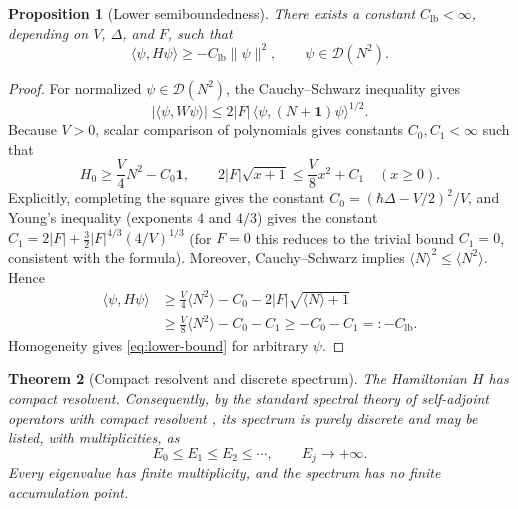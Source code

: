 \documentclass[11pt]{article}
\newtheorem{theorem}{Theorem}[section]
\newtheorem{proposition}[theorem]{Proposition}
\theoremstyle{remark}
\newcommand{\Dom}{\mathcal{D}}
\newcommand{\id}{\mathbf{1}}
\begin{document}
\begin{proposition}[Lower semiboundedness]\label{prop:lower-bound}
There exists a constant \(C_{\mathrm{lb}}<\infty\), depending on \(V\),
\(\Delta\), and \(F\), such that
\begin{equation}
 \langle\psi,H\psi\rangle\geq-C_{\mathrm{lb}}\|\psi\|^2,
 \qquad \psi\in\Dom(N^2).
 \label{eq:lower-bound}
\end{equation}
\end{proposition}

\begin{proof}
For normalized \(\psi\in\Dom(N^2)\), the Cauchy--Schwarz inequality gives
\begin{equation}
 |\langle\psi,W\psi\rangle|
 \leq 2|F|\,\langle\psi,(N+\id)\psi\rangle^{1/2}.
 \label{eq:form-drive}
\end{equation}
Because \(V>0\), scalar comparison of polynomials gives constants
\(C_0,C_1<\infty\) such that
\begin{equation}
 H_0\geq \frac{V}{4}N^2-C_0\id,
 \qquad
 2|F|\sqrt{x+1}\leq \frac{V}{8}x^2+C_1
 \quad (x\geq0).
 \label{eq:scalar-lower}
\end{equation}
Explicitly, completing the square gives the constant
\(C_0=(\hbar\Delta-V/2)^2/V\), and Young's inequality (exponents \(4\) and
\(4/3\)) gives the constant
\(C_1=2|F|+\tfrac32|F|^{4/3}(4/V)^{1/3}\) (for \(F=0\) this reduces to the
trivial bound \(C_1=0\), consistent with the formula).
Moreover, Cauchy--Schwarz implies
\(\langle N\rangle^2\leq\langle N^2\rangle\).  Hence
\begin{align}
 \langle\psi,H\psi\rangle
 &\geq \frac{V}{4}\langle N^2\rangle-C_0
       -2|F|\sqrt{\langle N\rangle+1} \\
 &\geq \frac{V}{8}\langle N^2\rangle-C_0-C_1
 \geq -C_0-C_1=:-C_{\mathrm{lb}}.
\end{align}
Homogeneity gives \eqref{eq:lower-bound} for arbitrary \(\psi\).
\end{proof}

\begin{theorem}[Compact resolvent and discrete spectrum]
\label{thm:compact-resolvent}
The Hamiltonian \(H\) has compact resolvent.  Consequently, by the standard
spectral theory of self-adjoint operators with compact resolvent
\cite{ReedSimon1978Analysis}, its spectrum is purely discrete and may be
listed, with multiplicities, as
\begin{equation}
 E_0\leq E_1\leq E_2\leq\cdots,\qquad E_j\longrightarrow+\infty.
 \label{eq:discrete-spectrum}
\end{equation}
Every eigenvalue has finite multiplicity, and the spectrum has no finite
accumulation point.
\end{theorem}
\end{document}
